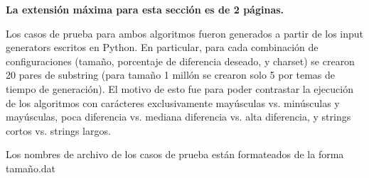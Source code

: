 \begin{mdframed}
    \textbf{La extensión máxima para esta sección es de 2 páginas.}
\end{mdframed}

Los casos de prueba para ambos algoritmos fueron generados a partir de los input generators escritos en Python. En particular, para cada combinación de configuraciones (tamaño, porcentaje de diferencia deseado, y charset) se crearon 20 pares de substring (para tamaño 1 millón se crearon solo 5 por temas de tiempo de generación). El motivo de esto fue para poder contrastar la ejecución de los algoritmos con carácteres exclusivamente mayúsculas vs. minúsculas y mayúsculas, poca diferencia vs. mediana diferencia vs. alta diferencia, y strings cortos vs. strings largos.

Los nombres de archivo de los casos de prueba están formateados de la forma {tamaño}.dat